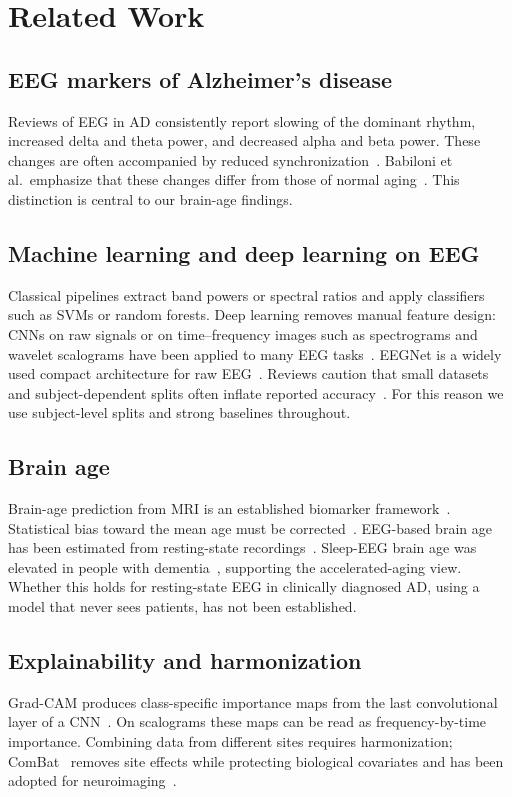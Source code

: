 \documentclass[conference]{IEEEtran}
\begin{document}
\section{Related Work}
\subsection{EEG markers of Alzheimer's disease}
Reviews of EEG in AD consistently report slowing of the dominant rhythm, increased delta and theta power, and decreased alpha and beta power. These changes are often accompanied by reduced synchronization~\cite{jeong2004,babiloni2020}. Babiloni et al.\ emphasize that these changes differ from those of normal aging~\cite{babiloni2020}. This distinction is central to our brain-age findings.

\subsection{Machine learning and deep learning on EEG}
Classical pipelines extract band powers or spectral ratios and apply classifiers such as SVMs or random forests. Deep learning removes manual feature design: CNNs on raw signals or on time--frequency images such as spectrograms and wavelet scalograms have been applied to many EEG tasks~\cite{craik2019,roy2019}. EEGNet is a widely used compact architecture for raw EEG~\cite{eegnet}. Reviews caution that small datasets and subject-dependent splits often inflate reported accuracy~\cite{roy2019,varoquaux2018}. For this reason we use subject-level splits and strong baselines throughout.

\subsection{Brain age}
Brain-age prediction from MRI is an established biomarker framework~\cite{cole2017,franke2019}. Statistical bias toward the mean age must be corrected~\cite{delange2020}. EEG-based brain age has been estimated from resting-state recordings~\cite{alzoubi2018,engemann2022}. Sleep-EEG brain age was elevated in people with dementia~\cite{sun2019}, supporting the accelerated-aging view. Whether this holds for resting-state EEG in clinically diagnosed AD, using a model that never sees patients, has not been established.

\subsection{Explainability and harmonization}
Grad-CAM produces class-specific importance maps from the last convolutional layer of a CNN~\cite{gradcam}. On scalograms these maps can be read as frequency-by-time importance. Combining data from different sites requires harmonization; ComBat~\cite{johnson2007} removes site effects while protecting biological covariates and has been adopted for neuroimaging~\cite{fortin2018}.
\end{document}
